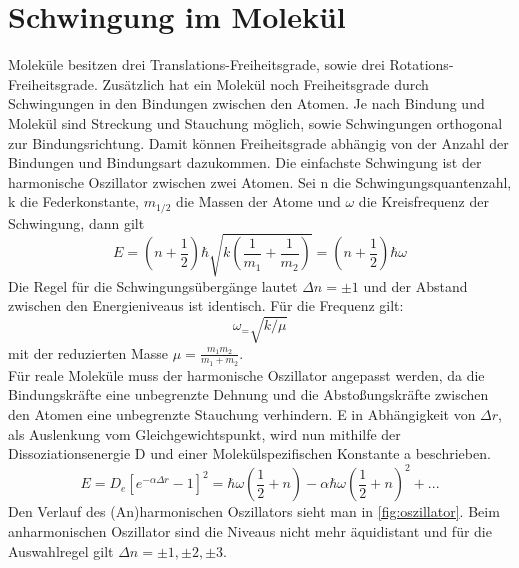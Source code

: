 \documentclass[.../bericht]{subfilies}
\begin{document}
  \section{Schwingung im Molekül}

    Moleküle besitzen drei Translations-Freiheitsgrade, sowie drei Rotations-Freiheitsgrade. Zusätzlich hat ein Molekül noch Freiheitsgrade durch Schwingungen in den Bindungen zwischen den Atomen. Je nach Bindung und Molekül sind Streckung und Stauchung möglich, sowie Schwingungen orthogonal zur Bindungsrichtung.  Damit können Freiheitsgrade abhängig von der Anzahl der Bindungen und Bindungsart dazukommen. Die einfachste Schwingung ist der harmonische Oszillator zwischen zwei Atomen. Sei n die Schwingungsquantenzahl, k die Federkonstante, $m_{1/2}$ die Massen der Atome und $\omega$ die Kreisfrequenz der Schwingung, dann gilt
    \begin{equation}
      E=(n+\frac{1}{2})\hbar \sqrt{k(\frac{1}{m_1}+\frac{1}{m_2})}=(n+\frac{1}{2})\hbar \omega
      \label{eq:harmonischeroszi}
    \end{equation}
    Die Regel für die Schwingungsübergänge lautet $\Delta n= \pm 1$ und der Abstand zwischen den Energieniveaus ist identisch. Für die Frequenz gilt:
    \begin{equation*}
      \omega_=\sqrt{k/\mu}
    \end{equation*}
    mit der reduzierten Masse $\mu=\frac{m_1m_2}{m_1+m_2}$.\\
    Für reale Moleküle muss der harmonische Oszillator angepasst werden, da die Bindungskräfte eine unbegrenzte Dehnung und die Abstoßungskräfte zwischen den Atomen eine unbegrenzte Stauchung verhindern. E in Abhängigkeit von $\Delta r$, als Auslenkung vom Gleichgewichtspunkt, wird nun mithilfe der Dissoziationsenergie D und einer Molekülspezifischen Konstante a beschrieben.
    \begin{equation}
      E=D_e[e^{-\alpha \Delta r}-1]^2=\hbar \omega(\frac{1}{2}+n)-\alpha \hbar \omega (\frac{1}{2}+n)^2+...
      \label{eq:anharmonischerosz}
    \end{equation}
    Den Verlauf des (An)harmonischen Oszillators sieht man in \cref{fig:oszillator}.
    Beim anharmonischen Oszillator sind die Niveaus nicht mehr äquidistant und für die Auswahlregel gilt $\Delta n= \pm 1, \pm 2, \pm 3$.\\
    \cite{schwingungsspek}
\end{document}
